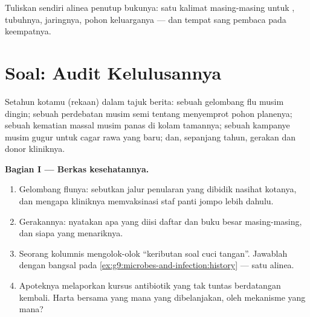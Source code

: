 \begin{exercise}[$\star\star\star$]\label{exo:g9:our-responsibility:12}
Tuliskan sendiri alinea penutup bukunya: satu kalimat
masing-masing untuk , tubuhnya, jaringnya, pohon
keluarganya --- dan tempat sang pembaca pada keempatnya.
\end{exercise}

\section{Soal: Audit Kelulusannya}

\begin{problem}\label{pb:g9:our-responsibility:1}
Setahun kotamu (rekaan) dalam tajuk berita: sebuah gelombang
flu musim dingin; sebuah perdebatan musim semi tentang
menyemprot pohon planenya; sebuah kematian massal  musim
panas di kolam tamannya; sebuah kampanye musim gugur untuk
cagar rawa yang baru; dan, sepanjang tahun, gerakan
 dan donor kliniknya.

\medskip\noindent\textbf{Bagian I --- Berkas kesehatannya.}
\begin{enumerate}
  \item Gelombang flunya: sebutkan jalur penularan yang
        dibidik nasihat kotanya, dan mengapa kliniknya
        memvaksinasi staf panti jompo lebih dahulu.
  \item Gerakannya: nyatakan apa yang diisi daftar  dan
        buku besar  masing-masing, dan siapa
        yang menariknya.
  \item Seorang kolumnis mengolok-olok ``keributan soal cuci
        tangan''. Jawablah dengan bangsal pada
        \cref{ex:g9:microbes-and-infection:history} --- satu
        alinea.
  \item Apoteknya melaporkan kursus antibiotik yang tak
        tuntas berdatangan kembali. Harta bersama yang mana
        yang dibelanjakan, oleh mekanisme yang mana?
\end{enumerate}


\end{problem}
